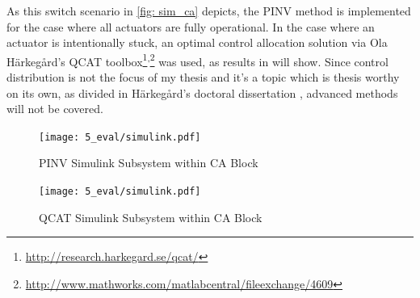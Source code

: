 \documentclass[12pt]{ucthesis}
\begin{document}
As this switch scenario in \autoref{fig: sim_ca} depicts, the PINV method is implemented for the case where all actuators are fully operational. In the case where an actuator is intentionally stuck, an optimal control allocation solution via Ola H\"{a}rkeg\aa{}rd's QCAT toolbox\footnote{\url{http://research.harkegard.se/qcat/}}\textsuperscript{,}\footnote{ \url{http://www.mathworks.com/matlabcentral/fileexchange/4609}} was used, as results in  will show. Since control distribution is not the focus of my thesis and it's a topic which is thesis worthy on its own, as divided in H\"{a}rkeg\aa{}rd's doctoral dissertation \citep{Harkegard2003}, advanced methods will not be covered. 
	\begin{figure}[H]
		\begin{adjustwidth}{-1in}{-1in}
			\centering
			\texttt{[image: 5\_eval/simulink.pdf]}%
		\end{adjustwidth}
		\caption{PINV Simulink Subsystem within CA Block }
		\label{fig: sim_ca_pinv}
	\end{figure}
	\begin{figure}[H]
		\begin{adjustwidth}{-1in}{-1in}
			\centering
			\texttt{[image: 5\_eval/simulink.pdf]}%
		\end{adjustwidth}
		\caption{QCAT Simulink Subsystem within CA Block }
		\label{fig: sim_ca_qcat}
	\end{figure}

\newpage
\thispagestyle{empty}
\mbox{}
\newpage
\end{document}
